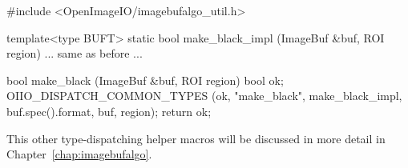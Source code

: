 \begin{code}
#include <OpenImageIO/imagebufalgo_util.h>

template<type BUFT>
static bool make_black_impl (ImageBuf &buf, ROI region)
{
    ... same as before ...
}

bool make_black (ImageBuf &buf, ROI region)
{
    bool ok;
    OIIO_DISPATCH_COMMON_TYPES (ok, "make_black", make_black_impl,
                                 buf.spec().format, buf, region);
    return ok;
}
\end{code}

\noindent This other type-dispatching helper macros will be discussed in more
detail in Chapter~\ref{chap:imagebufalgo}.


\chapwidthend
